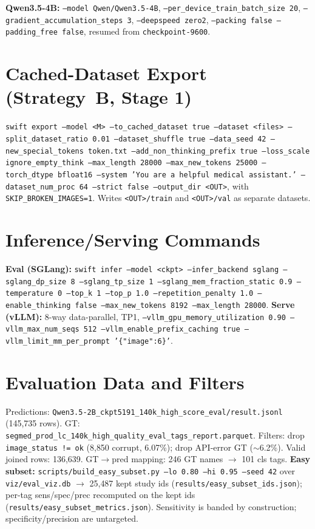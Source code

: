 \documentclass[11pt,a4paper]{article}
\begin{document}
\textbf{Qwen3.5-4B:} \texttt{--model Qwen/Qwen3.5-4B}, \texttt{--per\_device\_train\_batch\_size 20}, \texttt{--gradient\_accumulation\_steps 3}, \texttt{--deepspeed zero2}, \texttt{--packing false --padding\_free false}, resumed from \texttt{checkpoint-9600}.

\section{Cached-Dataset Export (Strategy~B, Stage 1)}
\label{app:export}
\texttt{swift export --model <M> --to\_cached\_dataset true --dataset <files> --split\_dataset\_ratio 0.01 --dataset\_shuffle true --data\_seed 42 --new\_special\_tokens token.txt --add\_non\_thinking\_prefix true --loss\_scale ignore\_empty\_think --max\_length 28000 --max\_new\_tokens 25000 --torch\_dtype bfloat16 --system 'You are a helpful medical assistant.' --dataset\_num\_proc 64 --strict false --output\_dir <OUT>}, with \texttt{SKIP\_BROKEN\_IMAGES=1}. Writes \texttt{<OUT>/train} and \texttt{<OUT>/val} as separate datasets.

\section{Inference/Serving Commands}
\label{app:serve}
\textbf{Eval (SGLang):} \texttt{swift infer --model <ckpt> --infer\_backend sglang --sglang\_dp\_size 8 --sglang\_tp\_size 1 --sglang\_mem\_fraction\_static 0.9 --temperature 0 --top\_k 1 --top\_p 1.0 --repetition\_penalty 1.0 --enable\_thinking false --max\_new\_tokens 8192 --max\_length 28000}. \textbf{Serve (vLLM):} 8-way data-parallel, TP1, \texttt{--vllm\_gpu\_memory\_utilization 0.90 --vllm\_max\_num\_seqs 512 --vllm\_enable\_prefix\_caching true --vllm\_limit\_mm\_per\_prompt '\{"image":6\}'}.

\section{Evaluation Data and Filters}
\label{app:evaldata}
Predictions: \texttt{Qwen3.5-2B\_ckpt5191\_140k\_high\_score\_eval/result.jsonl} (145{,}735 rows). GT: \texttt{segmed\_prod\_lc\_140k\_high\_quality\_eval\_tags\_report.parquet}. Filters: drop \texttt{image\_status != ok} (8{,}850 corrupt, 6.07\%); drop API-error GT ($\sim$6.2\%). Valid joined rows: 136{,}639. GT$\rightarrow$pred mapping: 246 GT names $\rightarrow$ 101 cls tags. \textbf{Easy subset:} \texttt{scripts/build\_easy\_subset.py --lo 0.80 --hi 0.95 --seed 42} over \texttt{viz/eval\_viz.db} $\rightarrow$ 25{,}487 kept study ids (\texttt{results/easy\_subset\_ids.json}); per-tag sens/spec/prec recomputed on the kept ids (\texttt{results/easy\_subset\_metrics.json}). Sensitivity is banded by construction; specificity/precision are untargeted.
\end{document}
